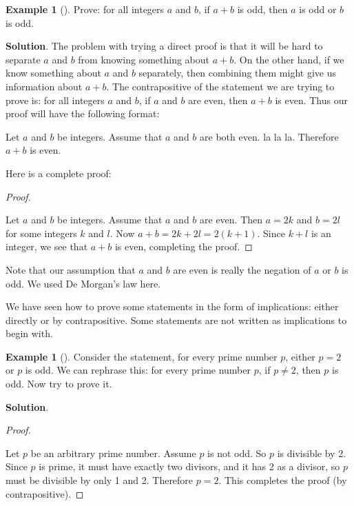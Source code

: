 \documentclass[10pt,]{book}
\theoremstyle{plain}
\theoremstyle{definition}
\theoremstyle{definition}
\newtheorem{example}[theorem]{Example}
\theoremstyle{definition}
\theoremstyle{definition}
\numberwithin{equation}{chapter}
\begin{document}
\begin{example}[]\label{example-67}
\hypertarget{p-1957}{}%
Prove: for all integers \(a\) and \(b\), if \(a + b\) is odd, then \(a\) is odd or \(b\) is odd.%
\par\smallskip%
\noindent\textbf{Solution}.\hypertarget{solution-182}{}\quad%
\hypertarget{p-1958}{}%
The problem with trying a direct proof is that it will be hard to separate \(a\) and \(b\) from knowing something about \(a+b\). On the other hand, if we know something about \(a\) and \(b\) separately, then combining them might give us information about \(a+b\). The contrapositive of the statement we are trying to prove is: for all integers \(a\) and \(b\), if \(a\) and \(b\) are even, then \(a+b\) is even. Thus our proof will have the following format:%
\par
\hypertarget{p-1959}{}%
Let \(a\) and \(b\) be integers. Assume that \(a\) and \(b\) are both even. la la la. Therefore \(a+b\) is even.%
\par
\hypertarget{p-1960}{}%
Here is a complete proof:%
\begin{proof}\hypertarget{proof-24}{}
\hypertarget{p-1961}{}%
Let \(a\) and \(b\) be integers. Assume that \(a\) and \(b\) are even. Then \(a = 2k\) and \(b = 2l\) for some integers \(k\) and \(l\). Now \(a + b = 2k + 2l = 2(k+1)\). Since \(k + l\) is an integer, we see that \(a + b\) is even, completing the proof.%
\end{proof}
\hypertarget{p-1962}{}%
Note that our assumption that \(a\) and \(b\) are even is really the negation of \(a\) or \(b\) is odd. We used De Morgan's law here.%
\end{example}
\hypertarget{p-1963}{}%
We have seen how to prove some statements in the form of implications: either directly or by contrapositive. Some statements are not written as implications to begin with.%
\begin{example}[]\label{example-68}
\hypertarget{p-1964}{}%
Consider the statement, for every prime number \(p\), either \(p = 2\) or \(p\) is odd. We can rephrase this: for every prime number \(p\), if \(p \ne 2\), then \(p\) is odd. Now try to prove it.%
\par\smallskip%
\noindent\textbf{Solution}.\hypertarget{solution-183}{}\quad%
\begin{proof}\hypertarget{proof-25}{}
\hypertarget{p-1965}{}%
Let \(p\) be an arbitrary prime number. Assume \(p\) is not odd. So \(p\) is divisible by 2. Since \(p\) is prime, it must have exactly two divisors, and it has 2 as a divisor, so \(p\) must be divisible by only 1 and 2. Therefore \(p = 2\). This completes the proof (by contrapositive).%
\end{proof}
\end{example}
\typeout{************************************************}
\typeout{************************************************}
\end{document}
